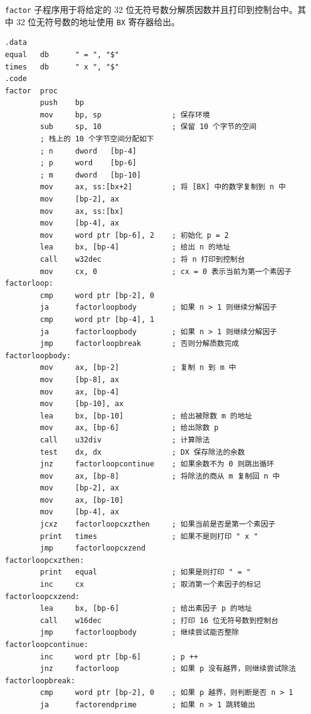 \verb|factor| 子程序用于将给定的 32 位无符号数分解质因数并且打印到控制台中。其中 32 位无符号数的地址使用 \verb|BX| 寄存器给出。

\begin{lstlisting}[language={[x86masm]Assembler},morekeywords={}]
.data
equal   db      " = ", "$"
times   db      " x ", "$"
.code
factor  proc
        push    bp
        mov     bp, sp                ; 保存环境
        sub     sp, 10                ; 保留 10 个字节的空间
        ; 栈上的 10 个字节空间分配如下
        ; n     dword   [bp-4]
        ; p     word    [bp-6]
        ; m     dword   [bp-10]
        mov     ax, ss:[bx+2]         ; 将 [BX] 中的数字复制到 n 中
        mov     [bp-2], ax
        mov     ax, ss:[bx]
        mov     [bp-4], ax
        mov     word ptr [bp-6], 2    ; 初始化 p = 2
        lea     bx, [bp-4]            ; 给出 n 的地址
        call    w32dec                ; 将 n 打印到控制台
        mov     cx, 0                 ; cx = 0 表示当前为第一个素因子
factorloop:
        cmp     word ptr [bp-2], 0
        ja      factorloopbody        ; 如果 n > 1 则继续分解因子
        cmp     word ptr [bp-4], 1
        ja      factorloopbody        ; 如果 n > 1 则继续分解因子
        jmp     factorloopbreak       ; 否则分解质数完成
factorloopbody:
        mov     ax, [bp-2]            ; 复制 n 到 m 中
        mov     [bp-8], ax
        mov     ax, [bp-4]
        mov     [bp-10], ax
        lea     bx, [bp-10]           ; 给出被除数 m 的地址
        mov     ax, [bp-6]            ; 给出除数 p
        call    u32div                ; 计算除法
        test    dx, dx                ; DX 保存除法的余数
        jnz     factorloopcontinue    ; 如果余数不为 0 则跳出循环
        mov     ax, [bp-8]            ; 将除法的商从 m 复制回 n 中
        mov     [bp-2], ax
        mov     ax, [bp-10]
        mov     [bp-4], ax
        jcxz    factorloopcxzthen     ; 如果当前是否是第一个素因子
        print   times                 ; 如果不是则打印 " x "
        jmp     factorloopcxzend
factorloopcxzthen:
        print   equal                 ; 如果是则打印 " = "
        inc     cx                    ; 取消第一个素因子的标记
factorloopcxzend:
        lea     bx, [bp-6]            ; 给出素因子 p 的地址
        call    w16dec                ; 打印 16 位无符号数到控制台
        jmp     factorloopbody        ; 继续尝试能否整除
factorloopcontinue:
        inc     word ptr [bp-6]       ; p ++
        jnz     factorloop            ; 如果 p 没有越界，则继续尝试除法
factorloopbreak:
        cmp     word ptr [bp-2], 0    ; 如果 p 越界，则判断是否 n > 1
        ja      factorendprime        ; 如果 n > 1 跳转输出

\end{lstlisting}

